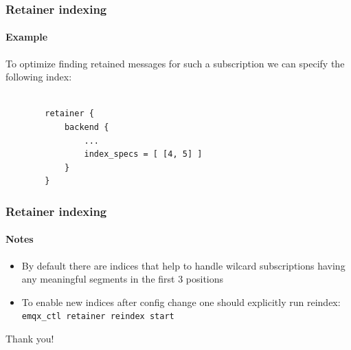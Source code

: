 \documentclass{beamer}
\begin{document}
\begin{frame}[fragile]
    \frametitle{Retainer indexing}
    \framesubtitle{Example}

    To optimize finding retained messages for such a subscription
    we can specify the following index:

    \vspace{1cm}
    \begin{lstlisting}

        retainer {
            backend {
                ...
                index_specs = [ [4, 5] ]
            }
        }
    \end{lstlisting}
\end{frame}

\begin{frame}[fragile]
    \frametitle{Retainer indexing}
    \framesubtitle{Notes}

    \begin{itemize}
        \item By default there are indices that help to handle wilcard subscriptions
        having any meaningful segments in the first 3 positions
        \item To enable new indices after config change one should explicitly run reindex:
        \lstinline{emqx_ctl retainer reindex start}
    \end{itemize}
\end{frame}

\begin{frame}
    \begin{center}
        Thank you!
    \end{center}
\end{frame}
\end{document}
